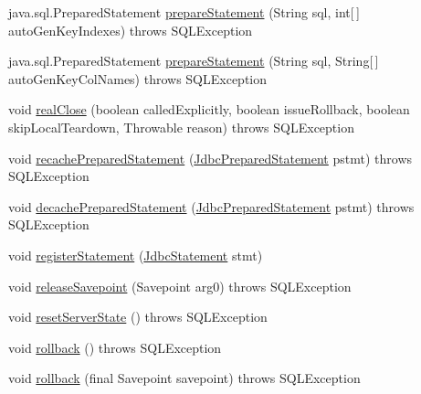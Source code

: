\begin{DoxyCompactItemize}
\item 
java.\+sql.\+Prepared\+Statement \mbox{\hyperlink{classcom_1_1mysql_1_1cj_1_1jdbc_1_1_connection_impl_abcca64304550ee544abe022189a9d8ea}{prepare\+Statement}} (String sql, int\mbox{[}$\,$\mbox{]} auto\+Gen\+Key\+Indexes)  throws S\+Q\+L\+Exception 
\item 
java.\+sql.\+Prepared\+Statement \mbox{\hyperlink{classcom_1_1mysql_1_1cj_1_1jdbc_1_1_connection_impl_ad765192f2c6f1753689fb86876ed43d3}{prepare\+Statement}} (String sql, String\mbox{[}$\,$\mbox{]} auto\+Gen\+Key\+Col\+Names)  throws S\+Q\+L\+Exception 
\item 
void \mbox{\hyperlink{classcom_1_1mysql_1_1cj_1_1jdbc_1_1_connection_impl_a8a78dfbe0aa7dd8b881a9f9716f16ed6}{real\+Close}} (boolean called\+Explicitly, boolean issue\+Rollback, boolean skip\+Local\+Teardown, Throwable reason)  throws S\+Q\+L\+Exception 
\item 
void \mbox{\hyperlink{classcom_1_1mysql_1_1cj_1_1jdbc_1_1_connection_impl_a7c4a014cd0c2d58c91a091ec4976434c}{recache\+Prepared\+Statement}} (\mbox{\hyperlink{interfacecom_1_1mysql_1_1cj_1_1jdbc_1_1_jdbc_prepared_statement}{Jdbc\+Prepared\+Statement}} pstmt)  throws S\+Q\+L\+Exception 
\item 
void \mbox{\hyperlink{classcom_1_1mysql_1_1cj_1_1jdbc_1_1_connection_impl_a06f0c5a49bcacd787553162a3926b1b7}{decache\+Prepared\+Statement}} (\mbox{\hyperlink{interfacecom_1_1mysql_1_1cj_1_1jdbc_1_1_jdbc_prepared_statement}{Jdbc\+Prepared\+Statement}} pstmt)  throws S\+Q\+L\+Exception 
\item 
void \mbox{\hyperlink{classcom_1_1mysql_1_1cj_1_1jdbc_1_1_connection_impl_a34559497cf5a4650696890f1de8a0a78}{register\+Statement}} (\mbox{\hyperlink{interfacecom_1_1mysql_1_1cj_1_1jdbc_1_1_jdbc_statement}{Jdbc\+Statement}} stmt)
\item 
void \mbox{\hyperlink{classcom_1_1mysql_1_1cj_1_1jdbc_1_1_connection_impl_a8fb92c8ea1c85d236a54bb88bafb7349}{release\+Savepoint}} (Savepoint arg0)  throws S\+Q\+L\+Exception 
\item 
void \mbox{\hyperlink{classcom_1_1mysql_1_1cj_1_1jdbc_1_1_connection_impl_adccdf6ec2e52545cff1a649ccecbdd62}{reset\+Server\+State}} ()  throws S\+Q\+L\+Exception 
\item 
void \mbox{\hyperlink{classcom_1_1mysql_1_1cj_1_1jdbc_1_1_connection_impl_adb29692483164e8c98dbeb9c6eb5a972}{rollback}} ()  throws S\+Q\+L\+Exception 
\item 
void \mbox{\hyperlink{classcom_1_1mysql_1_1cj_1_1jdbc_1_1_connection_impl_aed6d6c03e9c55548e5b235562ed5f9f3}{rollback}} (final Savepoint savepoint)  throws S\+Q\+L\+Exception 

\end{DoxyCompactItemize}

